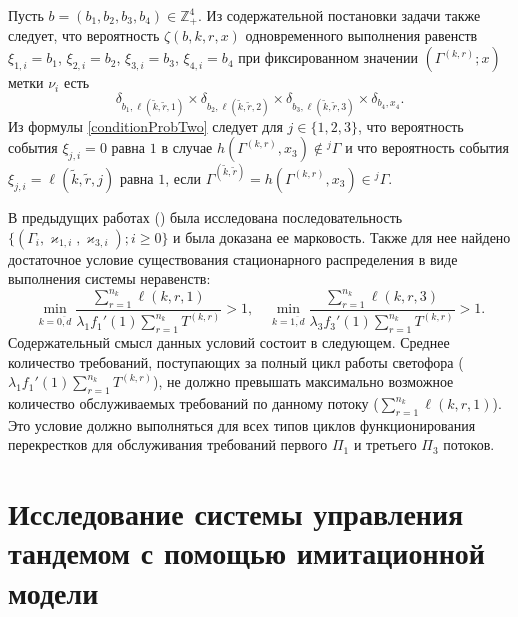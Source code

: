 \documentclass[11pt]{ubs}
\begin{document}
Пусть $b=(b_1, b_2, b_3, b_4) \in \mathbb{Z}_+^4$. Из содержательной постановки задачи также следует, что вероятность $\zeta(b, k, r, x)$ одновременного выполнения равенств $\xi_{1,i}=b_1$, $\xi_{2,i}=b_2$, $\xi_{3,i}=b_3$, $\xi_{4,i}=b_4$ при фиксированном значении $(\Gamma^{(k,r)}; x)$ метки $\nu_i$ есть
\begin{equation}
\delta_{b_1,\ell(\tilde{k},\tilde{r},1)} \times \delta_{b_2,\ell(\tilde{k},\tilde{r},2)} \times 
\delta_{b_3,\ell(\tilde{k},\tilde{r},3)} \times \delta_{b_4,x_4}.
\label{conditionProbTwo}
\end{equation}
Из формулы \eqref{conditionProbTwo} следует для $j\in \{1, 2, 3\}$, что вероятность события $\xi_{j,i}=0$ равна $1$ в случае $h(\Gamma^{(k,r)},x_3)\notin {}^j\Gamma$ и что вероятность события $\xi_{j,i}=\ell(\tilde{k},\tilde{r},j)$ равна $1$, если $\Gamma^{(\tilde{k},\tilde{r})}=h(\Gamma^{(k,r)},x_3)\in {}^j\Gamma$.






В предыдущих работах (\cite{Kocheganov:2018:1, Kocheganov:2017:2}) была исследована последовательность $\{(\Gamma_i, \varkappa_{1,i},\varkappa_{3,i}); i \geqslant 0\}$ и была доказана ее марковость. Также для нее найдено достаточное условие существования стационарного распределения в виде выполнения системы неравенств:
\begin{equation}
\min_{k=\overline{0,d}} { \frac{\sum_{r = 1}^{n_k} \ell(k,r,1) }{\lambda_1 f_1'(1) \sum_{r=1}^{n_k} T^{(k,r)} }}>1, \quad 
\min_{k=\overline{1,d}} { \frac{\sum_{r = 1}^{n_k} \ell(k,r,3) }{\lambda_3 f_3'(1) \sum_{r=1}^{n_k} T^{(k,r)} }}>1.
\label{sufficient:double}
\end{equation}
Содержательный смысл данных условий состоит в следующем. Среднее количество требований, поступающих за полный цикл работы светофора ($\lambda_1 f_1'(1) \sum_{r=1}^{n_k} T^{(k,r)} $), не должно превышать максимально возможное количество обслуживаемых требований по данному потоку ($\sum_{r = 1}^{n_k} \ell(k,r,1) $). Это условие должно выполняться для всех типов циклов функционирования перекрестков для обслуживания требований первого $\Pi_1$ и третьего $\Pi_3$ потоков.








\section{Исследование системы управления тандемом с помощью имитационной модели}
\end{document}
